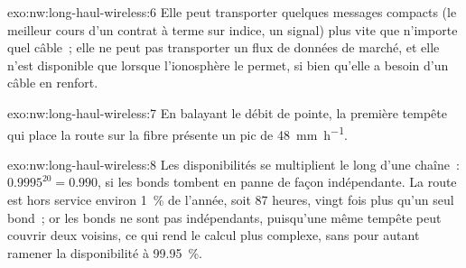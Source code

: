 \begin{solution}{exo:nw:long-haul-wireless:6}
Elle peut transporter quelques messages compacts (le meilleur cours d'un contrat à terme sur indice, un signal) plus vite que n'importe quel câble~; elle ne peut pas transporter un flux de données de marché, et elle
n'est disponible que lorsque l'ionosphère le permet, si bien qu'elle a besoin d'un câble en renfort.
\end{solution}

\begin{solution}{exo:nw:long-haul-wireless:7}
En balayant le débit de pointe, la première tempête qui place la route sur la fibre présente un pic de \qty{48}{\milli\metre\per\hour}.
\end{solution}

\begin{solution}{exo:nw:long-haul-wireless:8}
Les disponibilités se multiplient le long d'une chaîne~: $0.9995^{20} = 0.990$, si les bonds tombent en panne de façon indépendante. La route est hors service environ 1~\% de l'année, soit
87 heures, vingt fois plus qu'un seul bond~; or les bonds ne sont pas indépendants, puisqu'une même tempête peut couvrir deux voisins, ce qui rend le calcul
plus complexe, sans pour autant ramener la disponibilité à 99.95~\%.
\end{solution}

